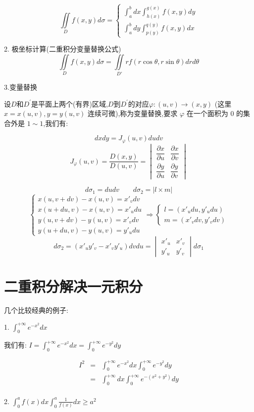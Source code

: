 $$\iint\limits_{D}f(x,y)d\sigma=
\begin{cases} \int_{a}^{b}dx\int_{h(x)}^{g(x)}f(x,y)dy \\
	\int_{a}^{b}dy\int_{p(y)}^{q(y)}f(x,y)dx\end{cases}$$

2. 极坐标计算(二重积分变量替换公式)\label{def: 极坐标计算二重积分}
$$\iint\limits_{D}f(x,y)d\sigma=\iint\limits_{D'}rf(r\cos \theta,r\sin \theta)drd\theta$$

3.变量替换\label{def: 变量替换}

设$D$和$D^{'}$是平面上两个(有界)区域,$D$到$D^{'}$的对应$\varphi :(u,v)\rightarrow(x,y)$ (这里 $x=x(u,v),y=y(u,v)$ 连续可微),称为变量替换,要求 $\varphi$ 在一个面积为 $0$ 的集合外是 $1\sim 1$,我们有:

$$dxdy=J_{\varphi}(u,v)dudv$$ 
$$J_{\varphi}(u,v)=\dfrac{D(x,y)}{D(u,v)}=
\begin{vmatrix}
	\dfrac{\partial x}{\partial u} & \dfrac{\partial x}{\partial v} \\
	\dfrac{\partial y}{\partial u} & \dfrac{\partial y}{\partial v}
\end{vmatrix}
$$

\begin{anymark}[注]
	$$d\sigma_{1}=dudv \qquad d\sigma_{2}=|l\times m|$$
	$$\begin{cases}
		x(u,v+dv)-x(u,v)=x'_{v}dv \\
		x(u+du,v)-x(u,v)=x'_{u}du \\
		y(u,v+dv)-y(u,v)=x'_{v}dv \\
		y(u+du,v)-y(u,v)=y'_{u}du
	 \end{cases}\Rightarrow 
	 \begin{cases}
		l=(x'_{u}du,y'_{u}du) \\
		m=(x'_{v}dv,y'_{v}dv)  
	\end{cases}$$
	$$d\sigma_{2}=(x'_{u}y'_{v}-x'_{v}y'_{u})dvdu=\begin{vmatrix}
			x'_{u} & x'_{v} \\
			y'_{u} & y'_{v}
		\end{vmatrix}d\sigma_{1}$$
\end{anymark}
\section{二重积分解决一元积分}
几个比较经典的例子:

1. $\int_{0}^{+\infty}e^{-x^{2}}dx$
\begin{anymark}[注]
	我们有: $I = \int_{0}^{+\infty}e^{-x^{2}}dx = \int_{0}^{+\infty}e^{-y^{2}}dy$

	\begin{eqnarray*}
		I^{2} &=& \int_{0}^{+\infty}e^{-x^{2}}dx\int_{0}^{+\infty}e^{-y^{2}}dy\\
			  &=& \int_{0}^{+\infty}dx\int_{0}^{+\infty}e^{-(x^{2}+y^{2})}dy\\
	\end{eqnarray*}
\end{anymark}
2. $\int_{0}^{a}f(x)dx\int_{0}^{a}\frac{1}{f(x)}dx\geq a^{2}$

